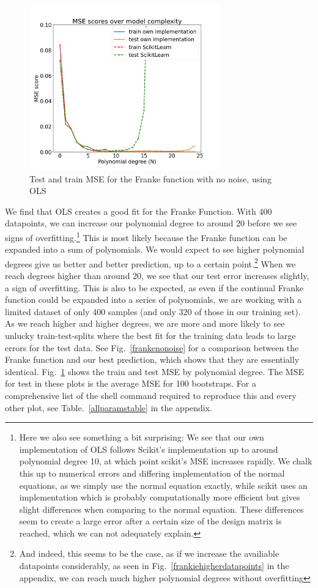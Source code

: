 \documentclass[twocolumn,10pt,cleanfoot]{asme2ej}
\begin{document}
\begin{figure} 
\centerline{\includegraphics[width=3.25in]{figure/frankenonoisemse.png}}
\caption{Test and train MSE for the Franke function with no noise, using OLS}
\label{frankenonoisemse}
\end{figure}

We find that OLS creates a good fit for the Franke Function. With 400 datapoints, we can increase our polynomial degree to around 20 before we see signs of overfitting.\footnote{Here we also see something a bit surprising: We see that our own implementation of OLS follows Scikit's implementation up to around polynomial degree 10, at which point scikit's MSE increases rapidly. We chalk this up to numerical errors and differing implementation of the normal equations, as we simply use the normal equation exactly, while scikit uses an implementation which is probably computationally more efficient but gives slight differences when comparing to the normal equation. These differences seem to create a large error after a certain size of the design matrix is reached, which we can not adequately explain.} This is most likely because the Franke function can be expanded into a sum of polynomials. We would expect to see higher polynomial degrees give us better and better prediction, up to a certain point.\footnote{And indeed, this seems to be the case, as if we increase the availiable datapoints considerably, as seen in Fig.~\ref{frankiehigherdatapoints} in the appendix, we can reach much higher polynomial degrees without overfitting} When we reach degrees higher than around 20, we see that our test error increases slightly, a sign of overfitting. This is also to be expected, as even if the continual Franke function could be expanded into a series of polynomials, we are working with a limited dataset of only 400 samples (and only 320 of those in our training set). As we reach higher and higher degrees, we are more and more likely to see unlucky train-test-splits where the best fit for the training data leads to large errors for the test data. See Fig.~\ref{frankenonoise} for a comparison between the Franke function and our best prediction, which shows that they are essentially identical. Fig.~\ref{frankenonoisemse} shows the train and test MSE by polynomial degree. The MSE for test in these plots is the average MSE for 100 bootstraps. For a comprehensive list of the shell command required to reproduce this and every other plot, see Table.~\ref{allparamstable} in the appendix.
\end{document}
